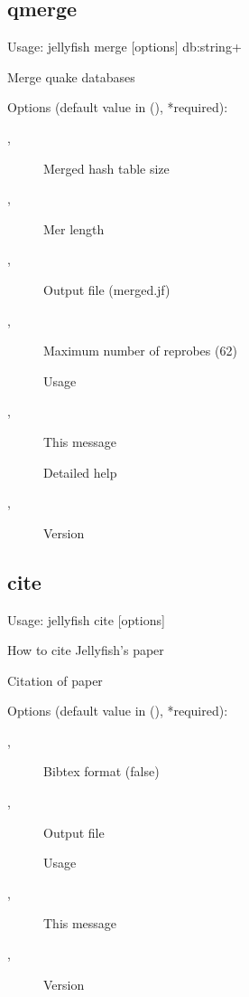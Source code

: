 \subsection{qmerge}
\noindent Usage: jellyfish merge [options] db:string+

\noindent Merge quake databases

\noindent Options (default value in (), *required):
\begin{description}
\item[,] \noindent *Merged hash table size
\item[,] \noindent *Mer length
\item[,] \noindent Output file (merged.jf)
\item[,] \noindent Maximum number of reprobes (62)
\item[] \noindent Usage
\item[,] \noindent This message
\item[] \noindent Detailed help
\item[,] \noindent Version
\end{description}

\subsection{cite}
\noindent Usage: jellyfish cite [options]

\noindent How to cite Jellyfish's paper

\noindent Citation of paper

\noindent Options (default value in (), *required):
\begin{description}
\item[,] \noindent Bibtex format (false)
\item[,] \noindent Output file
\item[] \noindent Usage
\item[,] \noindent This message
\item[,] \noindent Version
\end{description}

